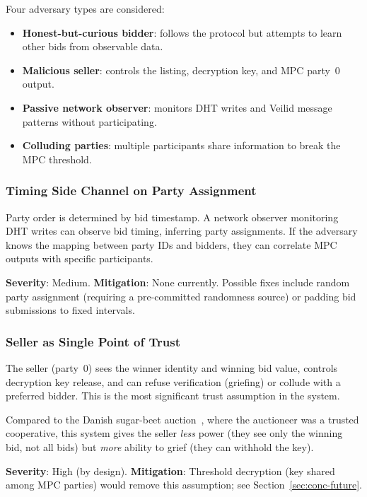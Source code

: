 Four adversary types are considered:
\begin{itemize}[noitemsep]
  \item \textbf{Honest-but-curious bidder}: follows the protocol but attempts
    to learn other bids from observable data.
  \item \textbf{Malicious seller}: controls the listing, decryption key, and
    MPC party~0 output.
  \item \textbf{Passive network observer}: monitors DHT writes and Veilid
    message patterns without participating.
  \item \textbf{Colluding parties}: multiple participants share information to
    break the MPC threshold.
\end{itemize}

\subsubsection{Timing Side Channel on Party Assignment}

Party order is determined by bid timestamp.  A network observer monitoring DHT
writes can observe bid timing, inferring party assignments.  If the adversary
knows the mapping between party IDs and bidders, they can correlate MPC
outputs with specific participants.

\textbf{Severity}: Medium.  \textbf{Mitigation}: None currently.  Possible
fixes include random party assignment (requiring a pre-committed randomness
source) or padding bid submissions to fixed intervals.

\subsubsection{Seller as Single Point of Trust}

The seller (party~0) sees the winner identity and winning bid value, controls
decryption key release, and can refuse verification (griefing) or collude with
a preferred bidder.  This is the most significant trust assumption in the
system.

Compared to the Danish sugar-beet auction~\cite{bogetoft2009_mpc_live}, where
the auctioneer was a trusted cooperative, this system gives the seller
\emph{less} power (they see only the winning bid, not all bids) but
\emph{more} ability to grief (they can withhold the key).

\textbf{Severity}: High (by design).  \textbf{Mitigation}: Threshold
decryption (key shared among MPC parties) would remove this assumption;
see Section~\ref{sec:conc-future}.

